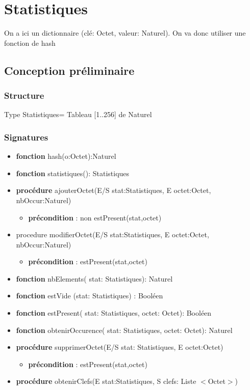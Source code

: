     \section*{Statistiques}
    On a ici un dictionnaire (clé: Octet, valeur: Naturel). On va donc utiliser une fonction de hash
    \subsection*{Conception préliminaire}
    \subsubsection*{Structure}

    Type Statistiques= Tableau [1..256] de Naturel 

    \subsubsection*{Signatures}
    \begin{itemize}[label=$\ $, leftmargin=1cm]
        \item \textbf{fonction} hash(o:Octet):Naturel
        \item \textbf{fonction} statistiques(): Statistiques
        \item \textbf{procédure} ajouterOctet(E/S stat:Statistiques, E octet:Octet, nbOccur:Naturel)
        \begin{itemize}[label=$| $, leftmargin=1cm]
            \item \textbf{précondition} : non estPresent(stat,octet)
        \end{itemize}
        \item procedure modifierOctet(E/S stat:Statistiques, E octet:Octet, nbOccur:Naturel)
        \begin{itemize}[label=$| $, leftmargin=1cm]
            \item \textbf{précondition} : estPresent(stat,octet)
        \end{itemize}
        \item \textbf{fonction} nbElements( stat: Statistiques): Naturel
        \item \textbf{fonction} estVide (stat: Statistiques) : Booléen
        \item \textbf{fonction} estPresent( stat: Statistiques, octet: Octet): Booléen
        \item \textbf{fonction} obtenirOccurence( stat: Statistiques, octet: Octet): Naturel
        \item \textbf{procédure} supprimerOctet(E/S stat: Statistiques, E octet:Octet)
        \begin{itemize}[label=$| $, leftmargin=1cm]
            \item \textbf{précondition} : estPresent(stat,octet)
        \end{itemize}
        \item \textbf{procédure} obtenirClefs(E stat:Statistiques, S clefs: Liste $<$Octet$>$)
	\end{itemize} 


